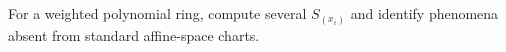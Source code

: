 \begin{problem}\label{chal:vi34-03}
For a weighted polynomial ring, compute several \(S_{(x_i)}\) and identify phenomena absent from standard affine-space charts.
\end{problem}
